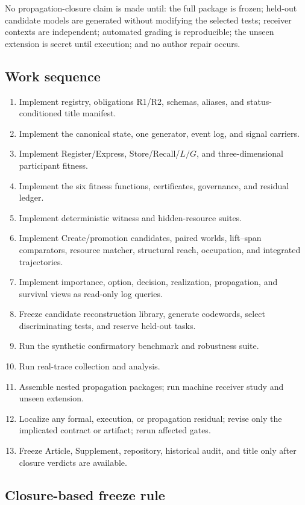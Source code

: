 \documentclass[11pt]{article}
\begin{document}
No propagation-closure claim is made until: the full package is frozen; held-out candidate models are generated without modifying the selected tests; receiver contexts are independent; automated grading is reproducible; the unseen extension is secret until execution; and no author repair occurs.

\subsection{Work sequence}

\begin{enumerate}
\item Implement registry, obligations R1/R2, schemas, aliases, and status-conditioned title manifest.
\item Implement the canonical state, one generator, event log, and signal carriers.
\item Implement Register/Express, Store/Recall/$L/G$, and three-dimensional participant fitness.
\item Implement the six fitness functions, certificates, governance, and residual ledger.
\item Implement deterministic witness and hidden-resource suites.
\item Implement Create/promotion candidates, paired worlds, lift--span comparators, resource matcher, structural reach, occupation, and integrated trajectories.
\item Implement importance, option, decision, realization, propagation, and survival views as read-only log queries.
\item Freeze candidate reconstruction library, generate codewords, select discriminating tests, and reserve held-out tasks.
\item Run the synthetic confirmatory benchmark and robustness suite.
\item Run real-trace collection and analysis.
\item Assemble nested propagation packages; run machine receiver study and unseen extension.
\item Localize any formal, execution, or propagation residual; revise only the implicated contract or artifact; rerun affected gates.
\item Freeze Article, Supplement, repository, historical audit, and title only after closure verdicts are available.
\end{enumerate}

\subsection{Closure-based freeze rule}
\end{document}
